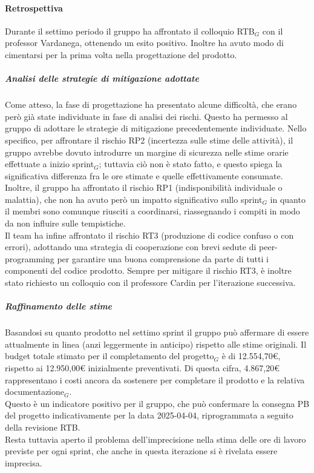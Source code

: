 \documentclass[10pt]{article}
\begin{document}
{{{{{{{{        \paragraph{Retrospettiva}\mbox{}\vspace{0.4em}

        Durante il settimo periodo il gruppo ha affrontato il colloquio RTB$_G$ con il professor Vardanega, ottenendo un esito positivo. Inoltre ha avuto modo di 
        cimentarsi per la prima volta nella progettazione del prodotto.

        \subparagraph{Analisi delle strategie di mitigazione adottate}\mbox{}\vspace{0.4em}

        Come atteso, la fase di progettazione ha presentato alcune difficoltà, che erano però già state individuate in fase di analisi dei rischi. Questo ha permesso
        al gruppo di adottare le strategie di mitigazione precedentemente individuate. Nello specifico, per affrontare il rischio RP2 (incertezza sulle stime delle 
        attività), il gruppo avrebbe dovuto introdurre un margine di sicurezza nelle stime orarie effettuate a inizio sprint$_G$; tuttavia ciò non è stato fatto, e questo
        spiega la significativa differenza fra le ore stimate e quelle effettivamente consumate.\\ 
        Inoltre, il gruppo ha affrontato il rischio RP1 (indisponibilità individuale o malattia), che non ha avuto però un impatto significativo sullo sprint$_G$ in 
        quanto il membri sono comunque riusciti a coordinarsi, riassegnando i compiti in modo da non influire sulle tempistiche.\\
        Il team ha infine affrontato il rischio RT3 (produzione di codice confuso o con errori), adottando una strategia di cooperazione con brevi sedute di 
        peer-programming per garantire una buona comprensione da parte di tutti i componenti del codice prodotto. Sempre per mitigare il rischio RT3, è inoltre stato 
        richiesto un colloquio con il professore Cardin per l'iterazione successiva.
        
        \subparagraph{Raffinamento delle stime}\mbox{}\vspace{0.4em}

        Basandosi su quanto prodotto nel settimo sprint il gruppo può affermare di essere attualmente in linea (anzi leggermente in anticipo) rispetto alle stime originali.
        Il budget totale stimato per il completamento del progetto$_G$ è di 12.554,70€, rispetto ai 12.950,00€ inizialmente preventivati. Di questa cifra, 4.867,20€ 
        rappresentano i costi ancora da sostenere per completare il prodotto e la relativa documentazione$_G$.\\
        Questo è un indicatore positivo per il gruppo, che può confermare la consegna PB del progetto indicativamente per la data 2025-04-04, riprogrammata a seguito della 
        revisione RTB.\\
        Resta tuttavia aperto il problema dell'imprecisione nella stima delle ore di lavoro previste per ogni sprint, che anche in questa iterazione si è rivelata essere
        imprecisa.\\


}}}}}}}}
\end{document}
